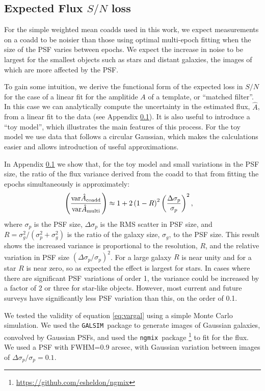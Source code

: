 \documentclass[fleqn,useAMS,usenatbib]{mnras}
\newcommand{\galsim}{\texttt{GALSIM}}
\newcommand{\ngmix}{\texttt{ngmix}}
\newcommand{\coadd}{{\rm coadd}}
\begin{document}
\subsection{Expected Flux $S/N$ loss}
\label{Subsection:FluxSN}


For the simple weighted mean coadds used in this work, we expect measurements
on a coadd to be noisier than those using optimal multi-epoch fitting when the
size of the PSF varies between epochs.  We expect the increase in noise to be
largest for the smallest objects such as stars and distant galaxies, the images
of which are more affected by the PSF.

To gain some intuition, we derive the functional form of the expected loss in
$S/N$ for the case of a linear fit for the amplitide $A$ of a template, or
``matched filter''.  In this case we can analytically compute the uncertainty
in the estimated flux, $\hat{A}$, from a linear fit to the data (see Appendix
\ref{Subsection:FluxSN}). It is also useful to introduce a ``toy model'', which
illustrates the main features of this process.  For the toy model we use data
that follows a circular Gaussian, which makes the calculations easier and
allows introduction of useful approximations.

In Appendix \ref{Subsection:FluxSN} we show that, for the toy model and small
variations in the PSF size, the ratio of the flux variance derived from the
coadd to that from fitting the epochs simultaneously is approximately:
\begin{align} \label{eq:vargal}
\left( \frac{ {\rm var} \hat{A}_\coadd}{{\rm var} \hat{A}_{\rm multi} } 
\right) &
\approx 1 + 2 \left( 1 - R \right)^2 \left( \frac{\Delta 
\sigma_p}{\sigma_p} \right)^2,
\end{align}
where $\sigma_p$ is the PSF size, $\Delta \sigma_p$ is the RMS scatter in PSF
size, and $R=\sigma_g^2/(\sigma_p^2 + \sigma_g^2)$ is the ratio of the galaxy
size, $\sigma_g$, to the PSF size.  This result shows the increased variance is
proportional to the resolution, $R$, and the relative variation in PSF size
$(\Delta \sigma_p/\sigma_p)^2$.  For a large galaxy $R$ is near unity and for a star
$R$ is near zero, so as expected the effect is largest for stars.  In cases where there
are significant PSF variations of order 1, the variance could be increased by a
factor of 2 or three for star-like objects.  However, most current and future
surveys have significantly less PSF variation than this, on the order of 0.1.

We tested the validity of equation \ref{eq:vargal} using a simple Monte Carlo
simulation.  We used the \galsim\ package to generate images of Gaussian
galaxies, convolved by Gaussian PSFs, and used the \ngmix\ package
\footnote{\url{https://github.com/esheldon/ngmix}} to fit for the flux. We used
a PSF with FWHM=0.9 arcsec, with Gaussian variation between images of $\Delta
\sigma_p/\sigma_p = 0.1$.
\end{document}
